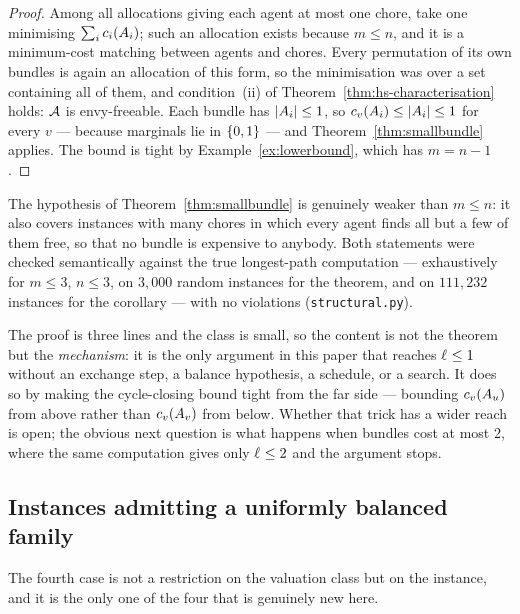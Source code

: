 \begin{proof}
Among all allocations giving each agent at most one chore, take one minimising
$\sum_i c_i(A_{i})$; such an allocation exists because $m \le n$, and
it is a minimum-cost matching between agents and chores. Every permutation of
its own bundles is again an allocation of this form, so the minimisation was
over a set containing all of them, and condition~(ii) of
Theorem~\ref{thm:hs-characterisation} holds: $\mathcal{A}$ is envy-freeable. Each
bundle has $\left\lvert A_{i}\right\rvert \le 1$, so $c_v(A_{i}) \le
\left\lvert A_{i}\right\rvert \le 1$ for every $v$ --- because marginals lie in $\left\{0,1\right\}$
--- and Theorem~\ref{thm:smallbundle} applies. The bound is tight by
Example~\ref{ex:lowerbound}, which has $m = n-1$.
\end{proof}

The hypothesis of Theorem~\ref{thm:smallbundle} is genuinely weaker than
$m \le n$: it also covers instances with many chores in which every agent finds
all but a few of them free, so that no bundle is expensive to anybody. Both
statements were checked semantically against the true longest-path computation
--- exhaustively for $m \le 3$, $n \le 3$, on $3{,}000$ random instances for the
theorem, and on $111{,}232$ instances for the corollary --- with no violations
(\texttt{structural.py}).

\begin{remark}
\label{rem:smallbundle-scope}
The proof is three lines and the class is small, so the content is not the
theorem but the \emph{mechanism}: it is the only argument in this paper that
reaches $\ell_{} \le 1$ without an exchange step, a balance hypothesis, a
schedule, or a search. It does so by making the cycle-closing bound tight from
the far side --- bounding $c_v(A_{u})$ from above rather than
$c_v(A_{v})$ from below. Whether that trick has a wider reach is open;
the obvious next question is what happens when bundles cost at most $2$, where
the same computation gives only $\ell_{} \le 2$ and the argument stops.
\end{remark}

\subsection{Instances admitting a uniformly balanced family}
\label{sec:balancedclass}

The fourth case is not a restriction on the valuation class but on the instance,
and it is the only one of the four that is genuinely new here.

